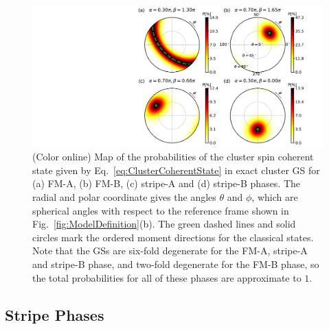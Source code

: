 \documentclass[aps,prb,reprint,amsfonts,amsmath,amssymb,showpacs,groupedaddress,superscriptaddress]{revtex4-1}
\begin{document}
\begin{figure}
    \centering
    \includegraphics[width=\columnwidth]{fig/Probabilities.pdf}
    \caption{\label{fig:Proabilities}(Color online) Map of the probabilities of the cluster spin coherent state given by Eq.~\eqref{eq:ClusterCoherentState} in exact cluster GS for (a) FM-A, (b) FM-B, (c) stripe-A and (d) stripe-B phases. The radial and polar coordinate gives the angles $\theta$ and $\phi$, which are spherical angles with respect to the reference frame shown in Fig.~\ref{fig:ModelDefinition}(b). The green dashed lines and solid circles mark the ordered moment directions for the classical states. Note that the GSs are six-fold degenerate for the FM-A, stripe-A and stripe-B phase, and two-fold degenerate for the FM-B phase, so the total probabilities for all of these phases are approximate to $1$. }
\end{figure}

\subsection{\label{subsec:StripePhases}Stripe Phases}
\end{document}
